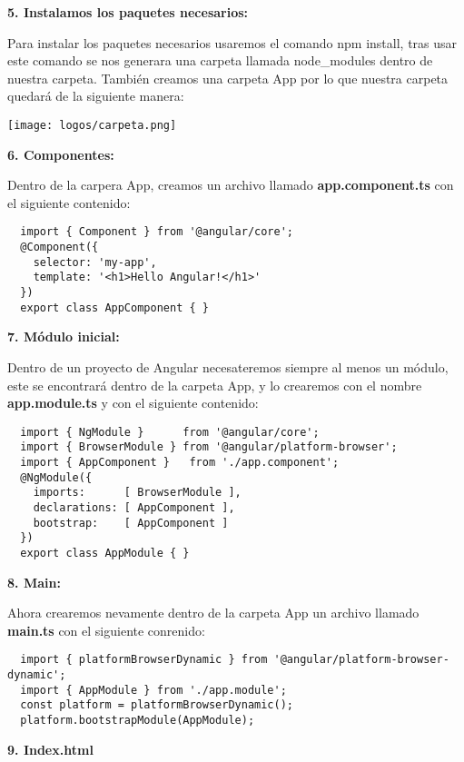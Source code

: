\documentclass[openany]{book}
\begin{document}
\textbf{5. Instalamos los paquetes necesarios: }

Para instalar los paquetes necesarios usaremos el comando npm install, tras usar este comando se nos generara una carpeta llamada node\_modules dentro de nuestra carpeta. También creamos una carpeta App por lo que nuestra carpeta quedará de la siguiente manera:

\texttt{[image: logos/carpeta.png]}

\pagebreak
\vspace*{5\baselineskip}
\textbf{6. Componentes:}

Dentro de la carpera App, creamos un archivo llamado \textbf{app.component.ts} con el siguiente contenido: 
\begin{lstlisting}
  import { Component } from '@angular/core';
  @Component({
    selector: 'my-app',
    template: '<h1>Hello Angular!</h1>'
  })
  export class AppComponent { }
\end{lstlisting}

\textbf{7. Módulo inicial:}

Dentro de un proyecto de Angular necesateremos siempre al menos un módulo, este se encontrará dentro de la carpeta App, y lo crearemos con el nombre \textbf{app.module.ts} y con el siguiente contenido:
\begin{lstlisting}
  import { NgModule }      from '@angular/core';
  import { BrowserModule } from '@angular/platform-browser';
  import { AppComponent }   from './app.component';
  @NgModule({
    imports:      [ BrowserModule ],
    declarations: [ AppComponent ],
    bootstrap:    [ AppComponent ]
  })
  export class AppModule { }
\end{lstlisting}

\textbf{8. Main: }

Ahora crearemos nevamente dentro de la carpeta App un archivo llamado \textbf{main.ts} con el siguiente conrenido: 
\begin{lstlisting}
  import { platformBrowserDynamic } from '@angular/platform-browser-dynamic';
  import { AppModule } from './app.module';
  const platform = platformBrowserDynamic();
  platform.bootstrapModule(AppModule);
\end{lstlisting}

\textbf{9. Index.html}
\end{document}
